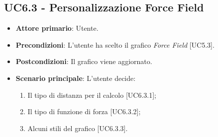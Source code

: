 \subsection{UC6.3 - Personalizzazione Force Field}
\begin{itemize}
	\item \textbf{Attore primario}: Utente.
	
	\item \textbf{Precondizioni}: L'utente ha scelto il grafico \textit{Force Field} [UC5.3].
	
	\item \textbf{Postcondizioni}: Il grafico viene aggiornato.
	
	\item \textbf{Scenario principale}: L'utente decide:
	
\begin{enumerate}
\item Il tipo di distanza per il calcolo [UC6.3.1];
\item Il tipo di funzione di forza [UC6.3.2];
\item Alcuni stili del grafico [UC6.3.3].
\end{enumerate}	
		
\end{itemize}

